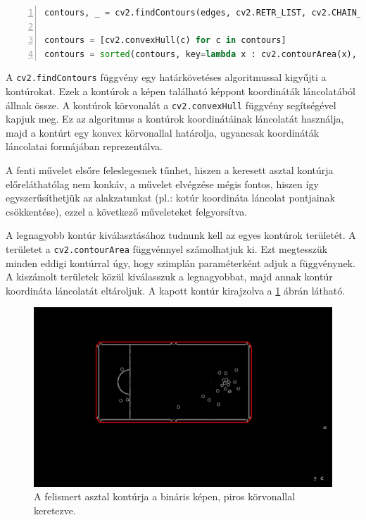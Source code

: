 \vspace{2mm}\begin{lstlisting}[language=Python, numbers=left]
contours, _ = cv2.findContours(edges, cv2.RETR_LIST, cv2.CHAIN_APPROX_SIMPLE)

contours = [cv2.convexHull(c) for c in contours]
contours = sorted(contours, key=lambda x : cv2.contourArea(x), reverse=True)[:1]
\end{lstlisting}

\par A \lstinline{cv2.findContours} függvény \cite{cv2_find_contours, SUZUKI198532} egy határkövetéses algoritmussal kigyűjti a kontúrokat. Ezek a kontúrok a képen található képpont koordináták láncolatából állnak össze. A kontúrok körvonalát a \lstinline{cv2.convexHull} függvény \cite{cv2_convex_hull,SKLANSKY198279} segítségével kapjuk meg. Ez az algoritmus a kontúrok koordinátáinak láncolatát használja, majd a kontúrt egy konvex körvonallal határolja, ugyancsak koordináták láncolatai formájában reprezentálva.
\par A fenti művelet elsőre feleslegesnek tűnhet, hiszen a keresett asztal kontúrja előreláthatólag nem konkáv, a művelet elvégzése mégis fontos, hiszen így egyszerűsíthetjük az alakzatunkat (pl.: kotúr koordináta láncolat pontjainak csökkentése), ezzel a következő műveleteket felgyorsítva.
\par A legnagyobb kontúr kiválasztásához tudnunk kell az egyes kontúrok területét. A területet a \lstinline{cv2.contourArea} függvénnyel \cite{cv2_contour_area} számolhatjuk ki. Ezt megtesszük minden eddigi kontúrral úgy, hogy szimplán paraméterként adjuk a függvénynek. A kiszámolt területek közül kiválasszuk a legnagyobbat, majd annak kontúr koordináta láncolatát eltároljuk. A kapott kontúr kirajzolva a \ref{fig:bemeneti_kep_contour} ábrán látható.

\begin{figure}[!ht]
    \centering
    \includegraphics[width=150mm, keepaspectratio]{figures/input_screen_contour.png}
    \caption{A felismert asztal kontúrja a bináris képen, piros körvonallal keretezve.}
    \label{fig:bemeneti_kep_contour}
\end{figure}

